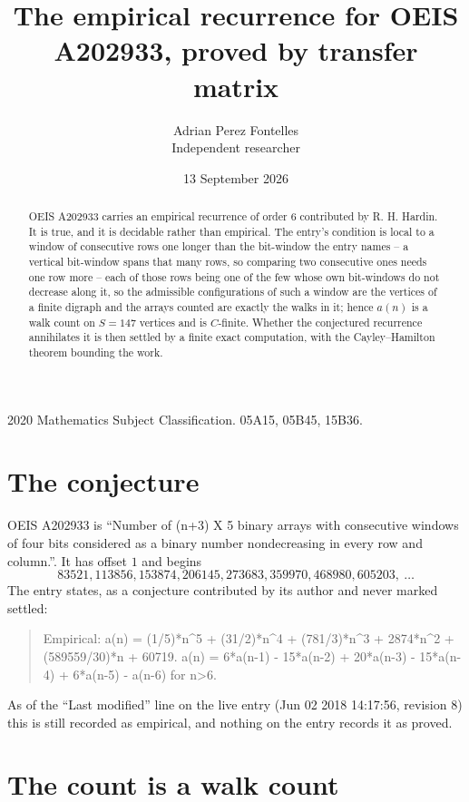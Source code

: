 \documentclass[11pt,a4paper]{article}
\title{The empirical recurrence for OEIS A202933, proved by transfer matrix}
\author{Adrian Perez Fontelles\\ \small Independent researcher}
\date{13 September 2026}
\theoremstyle{plain}
\theoremstyle{definition}
\begin{document}
\maketitle

\begin{abstract}
OEIS A202933 carries an empirical recurrence of order $6$ contributed by R. H. Hardin. It is
true, and it is decidable rather than empirical. The entry's condition is local to a window of consecutive rows one longer than the bit-window the entry names -- a vertical bit-window spans that many rows, so comparing two consecutive ones needs one row more -- each of those rows being one of the few whose own bit-windows do not decrease along it, so
the admissible configurations of such a window are the vertices of a finite digraph and the
arrays counted are exactly the walks in it; hence $a(n)$ is a walk count on $S=147$ vertices
and is $C$-finite. Whether the conjectured recurrence annihilates it is then settled by a
finite exact computation, with the Cayley--Hamilton theorem bounding the work.
\end{abstract}

\noindent\small 2020 Mathematics Subject Classification. 05A15, 05B45, 15B36.\normalsize

\section{The conjecture}

OEIS A202933 is ``Number of (n+3) X 5 binary arrays with consecutive windows of four bits considered as a binary number nondecreasing in every row and column.''. It has offset $1$ and begins
\[
83521, 113856, 153874, 206145, 273683, 359970, 468980, 605203,\ \dots
\]
The entry states, as a conjecture contributed by its author and never marked settled:
\begin{quote}
Empirical: a(n) = (1/5)*n\^{}5 + (31/2)*n\^{}4 + (781/3)*n\^{}3 + 2874*n\^{}2 + (589559/30)*n + 60719. a(n) = 6*a(n-1) - 15*a(n-2) + 20*a(n-3) - 15*a(n-4) + 6*a(n-5) - a(n-6) for n>6.
\end{quote}
As of the ``Last modified'' line on the live entry (Jun 02 2018 14:17:56, revision 8) this is still
recorded as empirical, and nothing on the entry records it as proved.

\section{The count is a walk count}
\end{document}
